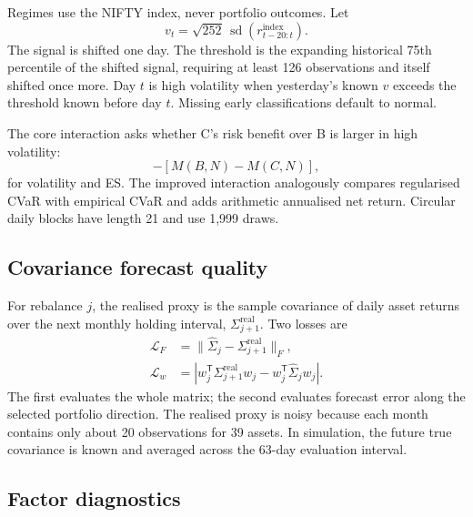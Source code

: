 \documentclass[11pt,a4paper]{article}
\newcommand{\wh}{\widehat}
\newcommand{\trans}{^{\mathsf T}}
\begin{document}
Regimes use the NIFTY index, never portfolio outcomes. Let
\begin{equation}
 v_t=\sqrt{252}\,\operatorname{sd}(r^{\text{index}}_{t-20:t}).
\end{equation}
The signal is shifted one day. The threshold is the expanding historical 75th percentile of the shifted signal, requiring at least 126 observations and itself shifted once more. Day $t$ is high volatility when yesterday's known $v$ exceeds the threshold known before day $t$. Missing early classifications default to normal.

The core interaction asks whether C's risk benefit over B is larger in high volatility:
\begin{equation}
 [M(B,H)-M(C,H)]-[M(B,N)-M(C,N)],
\end{equation}
for volatility and ES. The improved interaction analogously compares regularised CVaR with empirical CVaR and adds arithmetic annualised net return. Circular daily blocks have length 21 and use 1,999 draws.

\subsection{Covariance forecast quality}

For rebalance $j$, the realised proxy is the sample covariance of daily asset returns over the next monthly holding interval, $\Sigma^{\text{real}}_{j+1}$. Two losses are
\begin{align}
 \mathcal L_F&=\|\wh\Sigma_j-\Sigma^{\text{real}}_{j+1}\|_F,\\
 \mathcal L_w&=\left|w_j\trans\Sigma^{\text{real}}_{j+1}w_j-w_j\trans\wh\Sigma_jw_j\right|.
\end{align}
The first evaluates the whole matrix; the second evaluates forecast error along the selected portfolio direction. The realised proxy is noisy because each month contains only about 20 observations for 39 assets. In simulation, the future true covariance is known and averaged across the 63-day evaluation interval.

\subsection{Factor diagnostics}
\end{document}
